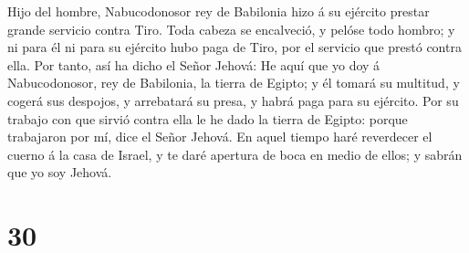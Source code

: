  Hijo del hombre, Nabucodonosor rey de Babilonia hizo á su
ejército prestar grande servicio contra Tiro. Toda cabeza se encalveció,
y pelóse todo hombro; y ni para él ni para su ejército hubo paga de
Tiro, por el servicio que prestó contra ella.  Por tanto,
así ha dicho el Señor Jehová: He aquí que yo doy á Nabucodonosor, rey de
Babilonia, la tierra de Egipto; y él tomará su multitud, y cogerá sus
despojos, y arrebatará su presa, y habrá paga para su ejército.
 Por su trabajo con que sirvió contra ella le he dado la
tierra de Egipto: porque trabajaron por mí, dice el Señor Jehová.
 En aquel tiempo haré reverdecer el cuerno á la casa de
Israel, y te daré apertura de boca en medio de ellos; y sabrán que yo
soy Jehová.

\hypertarget{section-29}{%
\section{30}\label{section-29}}


